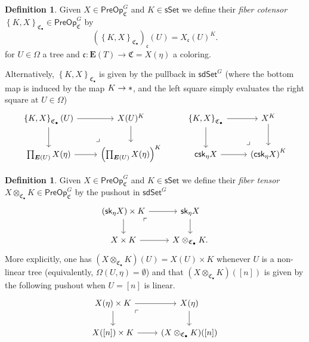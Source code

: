 \documentclass[a4paper,10pt
,draft
]{article}%
\numberwithin{equation}{section}
\numberwithin{figure}{section}
\theoremstyle{definition} %
\newtheorem{definition}[equation]{Definition}%
\newcommand{\1}{\ensuremath{\mathbbm 1}}%
\begin{document}
\begin{definition}
	Given $X \in \mathsf{PreOp}^{G}_{\mathfrak{C}}$ 
	and $K \in \mathsf{sSet}$
	we define their
	\emph{fiber cotensor} 
	$\left\{K, X \right\}_{\mathsf{\mathfrak{C}_{\bullet}}} \in \mathsf{PreOp}^G_{\mathfrak{C}}$
	by
	\begin{equation}\label{EASYCOTEN EQ}
	\left(
	\left\{ K, X \right\}_{\mathsf{\mathfrak{C}_{\bullet}}}
	\right)_{\mathfrak{c}} (U)
	=
	X_{\mathfrak{c}}(U)^K.
	\end{equation}	
	for $U \in \Omega$ a tree and 
	$\mathfrak{c} \colon \boldsymbol{E}(T) \to \mathfrak{C} =  X(\eta)$
	a coloring.
	
	Alternatively, 
	$\left\{K, X \right\}_{\mathsf{\mathfrak{C}_{\bullet}}}$
	is given by the pullback in $\mathsf{sdSet}^G$
	(where the bottom map is induced by the map $K \to \**$,
	and the left square simply evaluates the right square
	at $U \in \Omega$)
\begin{equation}
\begin{tikzcd}
	\left\{ K, X \right\}_{\mathsf{\mathfrak{C}_{\bullet}}} (U) \ar{r} \ar{d}
&
	X(U)^K \ar{d}
&%
	\left\{ K, X \right\}_{\mathsf{\mathfrak{C}_{\bullet}}} \ar{r} \ar{d}
&
	X^K \ar{d}
\\
	\prod_{\boldsymbol{E}(U)} X(\eta) \ar{r}
&
	\left(\prod_{\boldsymbol{E}(U)} X(\eta)\right)^K
	\arrow[lu, phantom, "\lrcorner", very near start]
&%
	\mathsf{csk}_{\eta} X  \ar{r}
&
	\left(\mathsf{csk}_{\eta} X\right)^K
	\arrow[lu, phantom, "\lrcorner", very near start]
\end{tikzcd}
\end{equation}
\end{definition}



\begin{definition}
	Given $X \in \mathsf{PreOp}^{G}_{\mathfrak{C}}$ 
	and $K \in \mathsf{sSet}$
	we define their
	\emph{fiber tensor}
	$X \otimes_{\mathfrak{C}_{\bullet}} K
	\in \mathsf{PreOp}^G_{\mathfrak{C}}$
	by the pushout in $\mathsf{sdSet}^G$
\begin{equation}\label{PREOPTENS EQ}
\begin{tikzcd}
	\left(\mathsf{sk}_{\eta}X \right) \times K \ar{r} \ar{d} \arrow[dr, phantom, "\ulcorner", very near start]  
&
	\mathsf{sk}_{\eta}X \ar{d}
\\
	X \times K \ar{r} 
& 
	X \otimes_{\mathfrak{C}_{\bullet}} K.
\end{tikzcd}
\end{equation}
More explicitly, 
one has
$(X \otimes_{\mathfrak{C}_{\bullet}} K)(U) = X(U) \times K$
whenever $U$ is a non-linear tree 
(equivalently, $\Omega(U,\eta)=\emptyset$)
and that $(X \otimes_{\mathfrak{C}_{\bullet}} K)([n])$
is given by the following pushout when $U=[n]$ is linear.
\[
\begin{tikzcd}
	X(\eta) \times K \ar{r} \ar{d} \arrow[dr, phantom, "\ulcorner", very near start]  
&
	X(\eta) \ar{d}
\\
	X([n]) \times K \ar{r} 
& 
	(X \otimes_{\mathfrak{C}_{\bullet}} K)([n]) 
\end{tikzcd}
\]
\end{definition}
\end{document}

